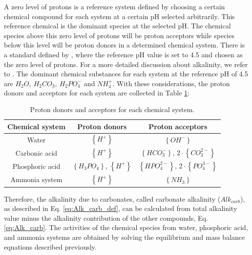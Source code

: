 \documentclass[10pt,a4paper]{article}
\begin{document}
A zero level of protons is a reference system defined by choosing a certain chemical compound for each system at a certain pH selected arbitrarily. This reference chemical is the dominant species at the selected pH. The chemical species above this zero level of protons will be proton acceptors while species below this level will be proton donors in a determined chemical system. There is a standard defined by , where the reference pH value is set to 4.5 and chosen as  the zero level of protons. For a more detailed discussion about alkalinity, we refer to .
The dominant chemical substances for each system at the reference pH of 4.5  are $H_{2}O, \ H_{2}CO_{3}, \ H_{2}PO_{4}^{-}$ and $NH_{4}^{+}$. With these considerations, the proton donors and acceptors for each system are collected in Table \ref{table:donors_and_aceptors}:
\begin{table}[H] 
	\begin{adjustwidth}{}{}
		\centering
		\caption{Proton donors and acceptors for each chemical system.} \label{table:donors_and_aceptors}
		\begin{tabular}{ c c c}
			\toprule
			Chemical system	& Proton donors	& Proton acceptors	\\ \midrule
			Water	& $\left\{ H^{+} \right\}$ & $\left\{ OH^{-} \right\}$	\\ 
			Carbonic acid	& $\left\{ H^{+} \right\}$ & $\left\{ HCO_{3}^{-} \right\}$, $2 \cdot \left\{CO_{3}^{2-}\right\}$	\\ 
			Phosphoric acid	& $\left\{ H_{3}PO_{4} \right\}$, $\left\{ H^{+} \right\}$ & $\left\{ HPO_{4}^{2-} \right\}$, $2 \cdot \left\{ PO_{4}^{3-} \right\}$	\\ 
			Ammonia system	& $\left\{ H^{+} \right\}$ & $\left\{ NH_{3} \right\}$	\\ \bottomrule
		\end{tabular}
	\end{adjustwidth}
\end{table}

Therefore, the alkalinity due to carbonates, called carbonate alkalinity ($Alk_{carb}$), as described in Eq. \ref{eq:Alk_carb_def}, can be calculated from total alkalinity value minus the alkalinity contribution of the other compounds, Eq. \ref{eq:Alk_carb}. The activities of the chemical species from water, phosphoric acid, and ammonia systems are obtained by solving the equilibrium and mass balance equations described previously.
\end{document}
